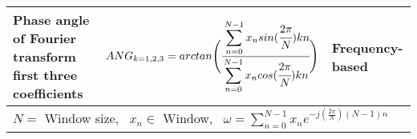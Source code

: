 \begin{table}[!htbp]
{\begin{tabular}{m{8cm}m{7.5cm}m{3cm}}
Phase angle of Fourier transform first three coefficients & \[ANG_{k=1,2,3} = arctan\Bigg(\cfrac{\displaystyle\sum\limits_{n=0}^{N-1}x_n sin{(\cfrac{2\pi}{N})kn}}{\displaystyle\sum\limits_{n=0}^{N-1}x_n cos{(\cfrac{2\pi}{N})kn}}\Bigg)\]& \multicolumn{1}{l}{Frequency-based}\\

        \bottomrule         
        \multicolumn{3}{l}{$N =$ {Window size,} \, $x_n \in$ {Window,} \, $\omega = \sum_{n=0}^{N-1}x_n e^{-j(\frac{2\pi}{N})(N-1)n}$}
        
    \label{tab:features_rider}
  \end{tabular}
  }

\end{table}
